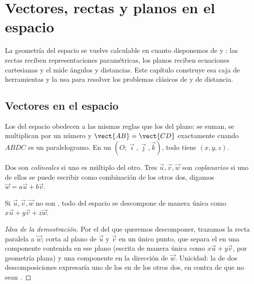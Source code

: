 \chapter{Vectores, rectas y planos en el espacio}\label{ch:g12:space}

La geometría del espacio se vuelve calculable en cuanto disponemos de
 y : las rectas reciben representaciones paramétricas,
los planos reciben ecuaciones cartesianas y el  mide
ángulos y distancias. Este capítulo construye esa caja de herramientas y la
usa para resolver los problemas clásicos de  y de distancia.

\section{Vectores en el espacio}

Los  del espacio obedecen a las mismas reglas que los del plano: se
suman, se multiplican por un número y $\vect{AB} = \vect{CD}$ exactamente
cuando $ABDC$ es un paralelogramo. En un 
$(O; \vec\imath, \vec\jmath, \vec k)$, todo  tiene 
$(x, y, z)$.

\begin{definition}\label{def:g12:space:collinear}
Dos  son \emph{colineales} si uno es múltiplo del otro. Tres
 $\vec u, \vec v, \vec w$ son \emph{coplanarios}
si uno de ellos se puede escribir como combinación de los otros dos,
digamos $\vec w = a\vec u + b\vec v$.
\end{definition}

\begin{proposition}\label{prop:g12:space:basis}
Si $\vec u, \vec v, \vec w$ no son , todo  del espacio se
descompone de manera única como $x\vec u + y\vec v + z\vec w$.
\end{proposition}

\begin{proof}[Idea de la demostración]
Por el  del  que queremos descomponer, trazamos la recta
paralela a $\vec w$; corta al plano de $\vec u$ y $\vec v$ en un único
punto, que separa el  en una componente contenida en ese plano
(escrita de manera única como $x\vec u + y\vec v$, por geometría plana) y
una componente en la dirección de $\vec w$. Unicidad: la  de dos
descomposiciones expresaría uno de los  en  de los otros
dos, en contra de que no sean .
\end{proof}


